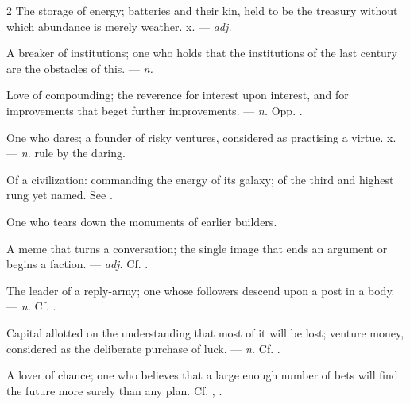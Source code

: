 \begin{multicols}{2}
 The storage of energy; batteries and their kin, held to be the treasury without which abundance is merely weather.   x. —  \textit{adj.}

 A breaker of institutions; one who holds that the institutions of the last century are the obstacles of this. —  \textit{n.}

 Love of compounding; the reverence for interest upon interest, and for improvements that beget further improvements. —  \textit{n.} Opp. .

 One who dares; a founder of risky ventures, considered as practising a virtue.   x. —  \textit{n.} rule by the daring.

 Of a civilization: commanding the energy of its galaxy; of the third and highest rung yet named. See .

 One who tears down the monuments of earlier builders.

 A meme that turns a conversation; the single image that ends an argument or begins a faction. —  \textit{adj.} Cf. .

 The leader of a reply-army; one whose followers descend upon a post in a body. —  \textit{n.} Cf. .

 Capital allotted on the understanding that most of it will be lost; venture money, considered as the deliberate purchase of luck. —  \textit{n.} Cf. .

 A lover of chance; one who believes that a large enough number of bets will find the future more surely than any plan. Cf. , .

\end{multicols}

